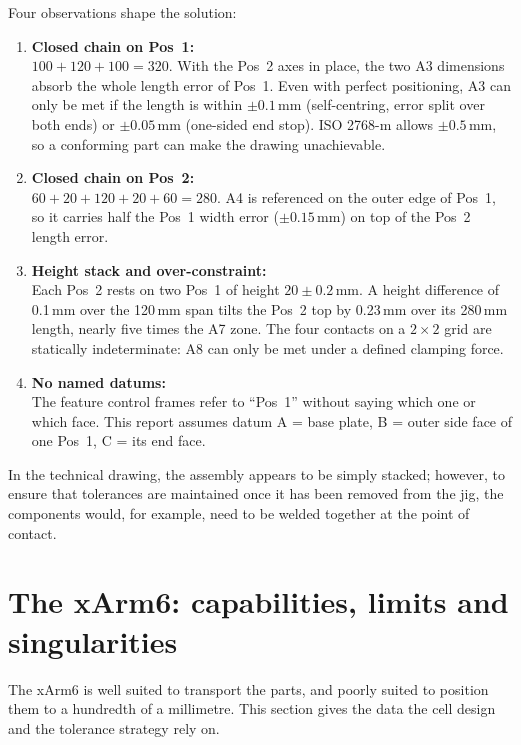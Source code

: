 \documentclass[11pt,a4paper]{article}
\begin{document}
Four observations shape the solution:
\begin{enumerate}
  \item \textbf{Closed chain on Pos~1:}\\ $100 + 120 + 100 = 320$. With the Pos~2 axes in place,
        the two A3 dimensions absorb the whole length error of Pos~1. Even with perfect
        positioning, A3 can only be met if the length is within $\pm0.1$\,mm (self-centring,
        error split over both ends) or $\pm0.05$\,mm (one-sided end stop). ISO 2768-m allows
        $\pm0.5$\,mm, so a conforming part can make the drawing unachievable.
  \item \textbf{Closed chain on Pos~2:}\\ $60 + 20 + 120 + 20 + 60 = 280$. A4 is referenced on the
        outer edge of Pos~1, so it carries half the Pos~1 width error ($\pm0.15$\,mm) on top of
        the Pos~2 length error.
  \item \textbf{Height stack and over-constraint:}\\ Each Pos~2 rests on two Pos~1 of height
        $20\pm0.2$\,mm. A height difference of 0.1\,mm over the 120\,mm span tilts the Pos~2 top
        by 0.23\,mm over its 280\,mm length, nearly five times the A7 zone. The four contacts on a
        $2\times2$ grid are statically indeterminate: A8 can only be met under a defined clamping
        force.
  \item \textbf{No named datums:}\\ The feature control frames refer to ``Pos~1'' without saying
        which one or which face. This report assumes datum A = base plate, B = outer side face of
        one Pos~1, C = its end face.
\end{enumerate}

In the technical drawing, the assembly appears to be simply stacked; however, to ensure that tolerances are maintained once it has been removed from the jig, the components would, for example, need to be welded together at the point of contact.

\section{The xArm6: capabilities, limits and singularities}
\label{sec:robot}

The xArm6 is well suited to transport the parts, and poorly suited to position them to a
hundredth of a millimetre. This section gives the data the cell design and the tolerance
strategy rely on.
\end{document}
